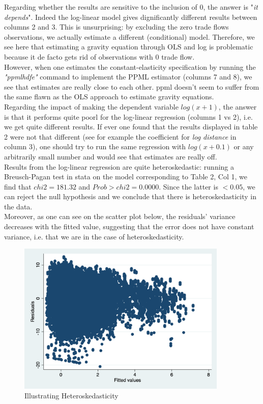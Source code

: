 \documentclass[10pt, final]{article}
\begin{document}
\newpage
\begin{landscape}
\center

\end{landscape}
Regarding whether the results are sensitive to the inclusion of $0$, the answer is "\textit{it depends}". Indeed the log-linear model gives dignificantly different results between columns 2 and 3. This is unsurprising: by excluding the zero trade flows observations, we actually estimate a different (conditional) model.
Therefore, we see here that estimating a gravity equation through OLS and log is problematic because it de facto gets rid of observations with 0 trade flow.
\\
However, when one estimates the constant-elasticity specification by running the \textit{"ppmlhdfe"} command to implement the PPML estimator (columns 7 and 8), we see that estimates are really close to each other. ppml doesn't seem to suffer from the same flawn as the OLS approach to estimate gravity equations.
\\
Regarding the impact of making the dependent variable $log(x+1)$, the answer is that it performs quite poorl for the log-linear regression (columns 1 vs 2), i.e. we get quite different results. If ever one found that the results displayed in table 2 were not that different (see for example the coefficient for \textit{log distance} in column 3), one should try to run the same regression with $log(x+0.1)$ or any arbitrarily small number and would see that estimates are really off.
\\
Results from the log-linear regression are quite heteroskedastic: running a Breusch-Pagan test in stata on the model corresponding to Table 2, Col 1, we find that $chi2 = 181.32$ and $Prob > chi2 = 0.0000$. Since the latter is $< 0.05$, we can reject the null hypothesis and we conclude that there is heteroskedasticity in the data.
\\
Moreover, as one can see on the scatter plot below, the residuals' variance decreases with the fitted value, suggesting that the error does not have constant variance, i.e. that we are in the case of heteroskedasticity.
\begin{figure}[h!]
\center
	\caption{Illustrating Heteroskedasticity}
	\includegraphics[width=10cm]{stata_table2_scatter.png}
\end{figure}
\end{document}

